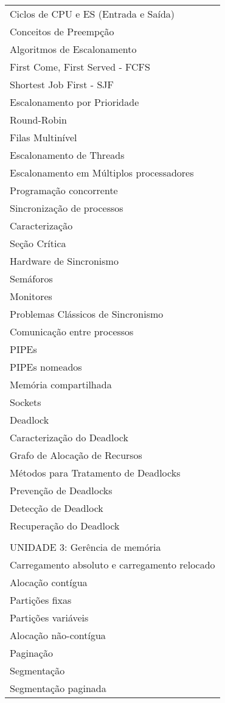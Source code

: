 \documentclass[12pt]{article}
\begin{document}
\begin{longtable}{|L{1.025\textwidth}|}
Ciclos de CPU e ES (Entrada e Saída)\\
Conceitos de Preempção\\
Algoritmos de Escalonamento\\
First Come, First Served - FCFS\\
Shortest Job First - SJF\\
Escalonamento por Prioridade\\
Round-Robin\\
Filas Multinível\\
Escalonamento de Threads\\
Escalonamento em Múltiplos processadores\\
Programação concorrente\\
Sincronização de processos\\
Caracterização\\
Seção Crítica\\
Hardware de Sincronismo\\
Semáforos\\
Monitores\\
Problemas Clássicos de Sincronismo\\
Comunicação entre processos\\
PIPEs\\
PIPEs nomeados\\
Memória compartilhada\\
Sockets\\
Deadlock\\
Caracterização do Deadlock\\
Grafo de Alocação de Recursos\\
Métodos para Tratamento de Deadlocks\\
Prevenção de Deadlocks\\
Detecção de Deadlock\\
Recuperação do Deadlock\\
\\
UNIDADE 3: Gerência de memória \\ %
Carregamento absoluto e carregamento relocado\\
Alocação contígua\\
Partições fixas\\
Partições variáveis\\
Alocação não-contígua\\
Paginação\\
Segmentação\\
Segmentação paginada\\

\end{longtable}
\end{document}
